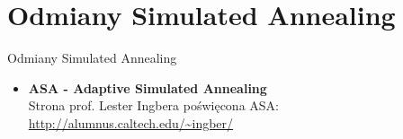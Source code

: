 \section{Odmiany Simulated Annealing}
	\begin{frame}{Odmiany Simulated Annealing}
		\begin{itemize}
			
			\item \textbf{ASA - Adaptive Simulated Annealing}\\			
			Strona prof. Lester Ingbera poświęcona ASA:\\
				\url{http://alumnus.caltech.edu/~ingber/}
			
			
			
			
		\end{itemize}

		
	\end{frame}
